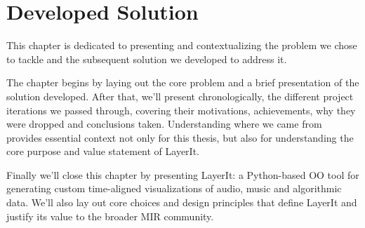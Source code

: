 \chapter{Developed Solution}\label{chap:chap3}
This chapter is dedicated to presenting and contextualizing the problem we chose to tackle and the subsequent solution we developed to address it. 

The chapter begins by laying out the core problem and a brief presentation of the solution developed. After that, we'll present chronologically, the different project iterations we passed through, covering their motivations, achievements, why they were dropped and conclusions taken. Understanding where we came from provides essential context not only for this thesis, but also for understanding the core purpose and value statement of LayerIt.

Finally we'll close this chapter by presenting LayerIt: a Python-based \ac{OO} tool for generating custom time-aligned visualizations of audio, music and algorithmic data. We'll also lay out core choices and design principles that define LayerIt and justify its value to the broader \ac{MIR} community.

